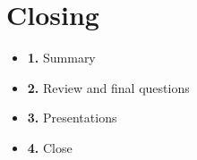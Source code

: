 \chapter{Closing}

\begin{itemize}
\tightlist
\item
  \textbf{1.} Summary
\item
  \textbf{2.} Review and final questions
\item
  \textbf{3.} Presentations
\item
  \textbf{4.} Close
\end{itemize}


